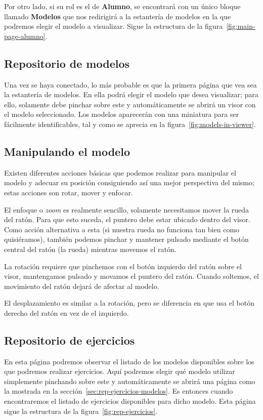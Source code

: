 Por otro lado, si su rol es el de \textbf{Alumno}, se encontrará con un único bloque llamado \textbf{Modelos} que nos redirigirá a la estantería de modelos en la que podremos elegir el modelo a visualizar. Sigue la estructura de la figura~\ref{fig:main-page-alumno}.

\subsection{Repositorio de modelos}\label{sec:rep-modelos}
Una vez se haya conectado, lo más probable es que la primera página que vea sea la estantería de modelos. En ella podrá elegir el modelo que desea visualizar; para ello, solamente debe pinchar sobre este y automáticamente se abrirá un visor con el modelo seleccionado. Los modelos aparecerán con una miniatura para ser fácilmente identificables, tal y como se aprecia en la figura~\ref{fig:models-in-viewer}.

\subsection{Manipulando el modelo}
Existen diferentes acciones básicas que podemos realizar para manipular el modelo y adecuar su posición consiguiendo así una mejor perspectiva del mismo; estas acciones son rotar, mover y enfocar.

El enfoque o \textit{zoom} es realmente sencillo, solamente necesitamos mover la rueda del ratón. Para que esto suceda, el puntero debe estar ubicado dentro del visor. Como acción alternativa a esta (si nuestra rueda no funciona tan bien como quisiéramos), también podemos pinchar y mantener pulsado mediante el botón central del ratón (la rueda) mientras movemos el ratón.

La rotación requiere que pinchemos con el botón izquierdo del ratón sobre el visor, mantengamos pulsado y movamos el puntero del ratón. Cuando soltemos, el movimiento del ratón dejará de afectar al modelo.

El desplazamiento es similar a la rotación, pero se diferencia en que usa el botón derecho del ratón en vez de el izquierdo.

\subsection{Repositorio de ejercicios}\label{sec:rep-ejercicios}
En esta página podremos observar el listado de los modelos disponibles sobre los que podremos realizar ejercicios. Aquí podremos elegir qué modelo utilizar simplemente pinchando sobre este y automáticamente se abrirá una página como la mostrada en la sección~\ref{sec:rep-ejercicios-modelos}. Es entonces cuando encontraremos el listado de ejercicios disponibles para dicho modelo. Esta página sigue la estructura de la figura~\ref{fig:rep-ejercicios}.

